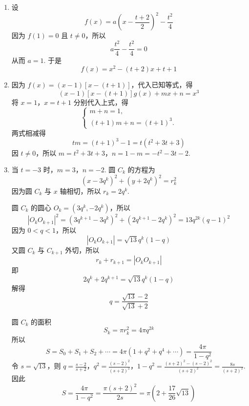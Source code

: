 \begin{solution}
\begin{enumerate}
\item 设
\[
f(x)=a\left(x-\frac{t+2}{2}\right)^2-\frac{t^2}{4}
\]
因为 \(f(1)=0\) 且 \(t\neq0\)，所以
\[
a\frac{t^2}{4}-\frac{t^2}{4}=0
\]
从而 \(a=1\). 于是
\[
f(x)=x^2-(t+2)x+t+1
\]

\item 因为 \(f(x)=(x-1)[x-(t+1)]\)，代入已知等式，得
\[
(x-1)[x-(t+1)]g(x)+mx+n=x^3
\]
将 \(x=1\)，\(x=t+1\) 分别代入上式，得
\[
\begin{cases}
m+n=1,\\
(t+1)m+n=(t+1)^3.
\end{cases}
\]
两式相减得
\[
tm=(t+1)^3-1=t\left(t^2+3t+3\right)
\]
因 \(t\neq0\)，所以
\(m=t^2+3t+3\)，\(n=1-m=-t^2-3t-2\).

\item 当 \(t=-3\) 时，\(m=3\)，\(n=-2\). 圆 \(C_k\) 的方程为
\[
(x-3q^k)^2+(y+2q^k)^2=r_k^2
\]
因为圆 \(C_k\) 与 \(x\) 轴相切，所以 \(r_k=2q^k\).

圆 \(C_k\) 的圆心 \(O_k=(3q^k,-2q^k)\)，所以
\[
|O_kO_{k+1}|^2=(3q^{k+1}-3q^k)^2+(2q^{k+1}-2q^k)^2
=13q^{2k}(q-1)^2
\]
因为 \(0<q<1\)，所以
\[
|O_kO_{k+1}|=\sqrt{13}q^k(1-q)
\]
又圆 \(C_k\) 与 \(C_{k+1}\) 外切，所以
\[
r_k+r_{k+1}=|O_kO_{k+1}|
\]
即
\[
2q^k+2q^{k+1}=\sqrt{13}q^k(1-q)
\]
解得
\[
q=\frac{\sqrt{13}-2}{\sqrt{13}+2}
\]

圆 \(C_k\) 的面积
\[
S_k=\pi r_k^2=4\pi q^{2k}
\]
所以
\[
S=S_0+S_1+S_2+\cdots
=4\pi(1+q^2+q^4+\cdots)
=\frac{4\pi}{1-q^2}
\]
令 \(s=\sqrt{13}\)，则
\(q=\frac{s-2}{s+2}\)，\(q^2=\frac{(s-2)^2}{(s+2)^2}\)，\(1-q^2=\frac{(s+2)^2-(s-2)^2}{(s+2)^2} =\frac{8s}{(s+2)^2}\).
因此
\[
S=\frac{4\pi}{1-q^2}
=\frac{\pi(s+2)^2}{2s}
=\pi\left(2+\frac{17}{26}\sqrt{13}\right)
\]
\end{enumerate}
\end{solution}
